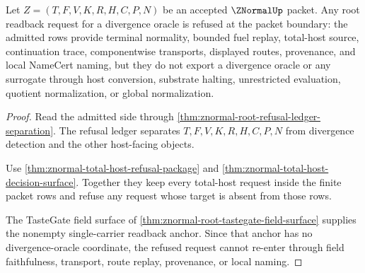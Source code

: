 \begin{theorem}
\label{thm:znormal-divergence-oracle-refusal}
Let $Z=(T,F,V,K,R,H,C,P,N)$ be an accepted $\ZNormalUp$ packet. Any root readback request for a divergence oracle is refused at the packet boundary: the admitted rows provide terminal normality, bounded fuel replay, total-host source, continuation trace, componentwise transports, displayed routes, provenance, and local NameCert naming, but they do not export a divergence oracle or any surrogate through host conversion, substrate halting, unrestricted evaluation, quotient normalization, or global normalization.
\end{theorem}
\begin{proof}
Read the admitted side through \autoref{thm:znormal-root-refusal-ledger-separation}. The refusal ledger separates $T,F,V,K,R,H,C,P,N$ from divergence detection and the other host-facing objects.

Use \autoref{thm:znormal-total-host-refusal-package} and \autoref{thm:znormal-total-host-decision-surface}. Together they keep every total-host request inside the finite packet rows and refuse any request whose target is absent from those rows.

The TasteGate field surface of \autoref{thm:znormal-root-tastegate-field-surface} supplies the nonempty single-carrier readback anchor. Since that anchor has no divergence-oracle coordinate, the refused request cannot re-enter through field faithfulness, transport, route replay, provenance, or local naming.
\end{proof}

